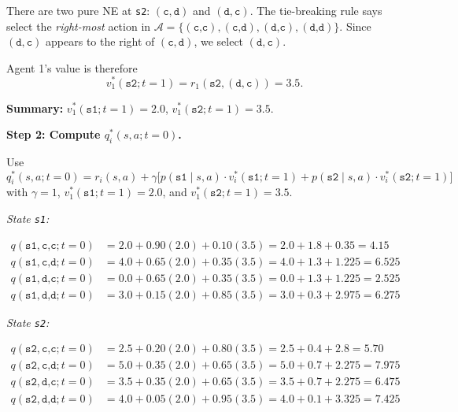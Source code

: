 \begin{solution}
There are two pure NE at \texttt{s2}: $(\texttt{c},\texttt{d})$ and $(\texttt{d},\texttt{c})$. The tie-breaking rule says select the \emph{right-most} action in $\mathcal{A} = \{(\texttt{c,c}),(\texttt{c,d}),(\texttt{d,c}),(\texttt{d,d})\}$. Since $(\texttt{d},\texttt{c})$ appears to the right of $(\texttt{c},\texttt{d})$, we select $(\texttt{d},\texttt{c})$.

Agent 1's value is therefore
\[
v_1^*(\texttt{s2};t=1) = r_1(\texttt{s2},(\texttt{d},\texttt{c})) = 3.5.
\]

\medskip
\noindent \textbf{Summary:} $v_1^*(\texttt{s1};t=1) = 2.0$, \quad $v_1^*(\texttt{s2};t=1) = 3.5$.

\bigskip
\noindent \textbf{Step 2: Compute $q_i^*(s,a;t=0)$.}

Use
\[
q_i^*(s,a;t=0) = r_i(s,a) + \gamma\bigl[p(\texttt{s1}\mid s,a)\cdot v_i^*(\texttt{s1};t=1) + p(\texttt{s2}\mid s,a)\cdot v_i^*(\texttt{s2};t=1)\bigr]
\]
with $\gamma=1$, $v_1^*(\texttt{s1};t=1)=2.0$, and $v_1^*(\texttt{s2};t=1)=3.5$.

\medskip
\noindent \textit{State \texttt{s1}:}

\begin{align*}
q(\texttt{s1},\texttt{c,c};t=0) &= 2.0 + 0.90(2.0) + 0.10(3.5) = 2.0 + 1.8 + 0.35 = \mathbf{4.15}\\
q(\texttt{s1},\texttt{c,d};t=0) &= 4.0 + 0.65(2.0) + 0.35(3.5) = 4.0 + 1.3 + 1.225 = \mathbf{6.525}\\
q(\texttt{s1},\texttt{d,c};t=0) &= 0.0 + 0.65(2.0) + 0.35(3.5) = 0.0 + 1.3 + 1.225 = \mathbf{2.525}\\
q(\texttt{s1},\texttt{d,d};t=0) &= 3.0 + 0.15(2.0) + 0.85(3.5) = 3.0 + 0.3 + 2.975 = \mathbf{6.275}
\end{align*}

\medskip
\noindent \textit{State \texttt{s2}:}

\begin{align*}
q(\texttt{s2},\texttt{c,c};t=0) &= 2.5 + 0.20(2.0) + 0.80(3.5) = 2.5 + 0.4 + 2.8 = \mathbf{5.70}\\
q(\texttt{s2},\texttt{c,d};t=0) &= 5.0 + 0.35(2.0) + 0.65(3.5) = 5.0 + 0.7 + 2.275 = \mathbf{7.975}\\
q(\texttt{s2},\texttt{d,c};t=0) &= 3.5 + 0.35(2.0) + 0.65(3.5) = 3.5 + 0.7 + 2.275 = \mathbf{6.475}\\
q(\texttt{s2},\texttt{d,d};t=0) &= 4.0 + 0.05(2.0) + 0.95(3.5) = 4.0 + 0.1 + 3.325 = \mathbf{7.425}
\end{align*}


\end{solution}
